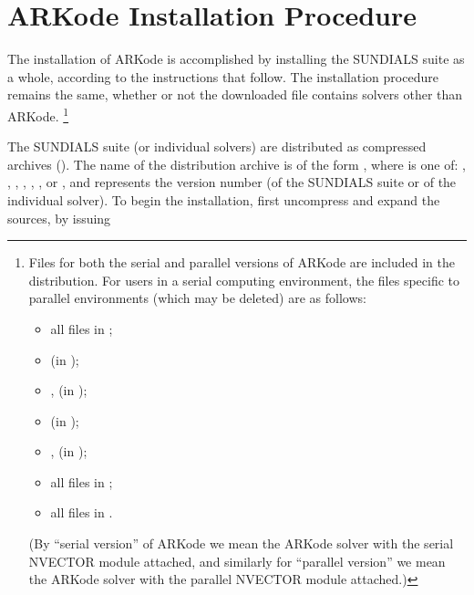 \documentclass[letterpaper,10pt,english]{sphinxmanual}
\begin{document}
\chapter{ARKode Installation Procedure}
\label{Install:installation}\label{Install:arkode-installation-procedure}\label{Install::doc}
The installation of ARKode is accomplished by installing the SUNDIALS
suite as a whole, according to the instructions that follow.  The
installation procedure remains the same, whether or not the downloaded
file contains solvers other than ARKode. \footnote{
Files for both the serial and parallel versions of ARKode are
included in the distribution. For users in a serial computing
environment, the files specific to parallel environments
(which may be deleted) are as follows:
\begin{itemize}
\item {} 
all files in ;

\item {} 
 (in );

\item {} 
,  (in
);

\item {} 
 (in );

\item {} 
,  (in );

\item {} 
all files in ;

\item {} 
all files in .

\end{itemize}

(By ``serial version'' of ARKode we mean the ARKode solver with
the serial NVECTOR module attached, and similarly for
“parallel version” we mean the ARKode solver with the
parallel NVECTOR module attached.)
}

The SUNDIALS suite (or individual solvers) are distributed as
compressed archives ().  The name of the distribution
archive is of the form , where  is
one of: , , , , ,
, or , and  represents the version number
(of the SUNDIALS suite or of the individual solver). To begin the
installation, first uncompress and expand the sources, by issuing
\end{document}
